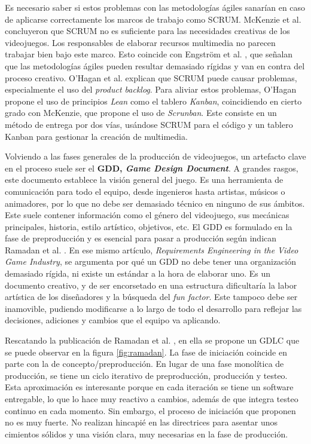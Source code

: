 Es necesario saber si estos problemas con las metodologías ágiles sanarían en caso de aplicarse correctamente los marcos de trabajo como SCRUM. McKenzie et al. \cite{mckenzie} concluyeron que SCRUM no es suficiente para las necesidades creativas de los videojuegos. Los responsables de elaborar recursos multimedia no parecen trabajar bien bajo este marco. Esto coincide con Engström et al. \cite{ENGSTROM201810}, que señalan que las metodologías ágiles pueden resultar demasiado rígidas y van en contra del proceso creativo. O'Hagan et al. \cite{ohagan} explican que SCRUM puede causar problemas, especialmente el uso del \textit{product backlog}. Para aliviar estos problemas, O'Hagan propone el uso de principios \textit{Lean} como el tablero \textit{Kanban}, coincidiendo en cierto grado con McKenzie, que propone el uso de \textit{Scrunban}. Este consiste en un método de entrega por dos vías, usándose SCRUM para el código y un tablero Kanban para gestionar la creación de multimedia.

Volviendo a las fases generales de la producción de videojuegos, un artefacto clave en el proceso suele ser el \textbf{GDD, \textit{Game Design Document}}. A grandes rasgos, este documento establece la visión general del juego. Es una herramienta de comunicación para todo el equipo, desde ingenieros hasta artistas, músicos o animadores, por lo que no debe ser demasiado técnico en ninguno de sus ámbitos. Este suele contener información como el género del videojuego, sus mecánicas principales, historia, estilo artístico, objetivos, etc. El GDD es formulado en la fase de preproducción y es esencial para pasar a producción según indican Ramadan et al. \cite{ramadan}. En ese mismo artículo, \textit{Requirements Engineering in the Video Game Industry}, se argumenta por qué un GDD no debe tener una organización demasiado rígida, ni existe un estándar a la hora de elaborar uno. Es un documento creativo, y de ser encorsetado en una estructura dificultaría la labor artística de los diseñadores y la búsqueda del \textit{fun factor}. Este tampoco debe ser inamovible, pudiendo modificarse a lo largo de todo el desarrollo para reflejar las decisiones, adiciones y cambios que el equipo va aplicando.

Rescatando la publicación de Ramadan et al. \cite{ramadan}, en ella se propone un GDLC que se puede observar en la figura \ref{fig:ramadan}. La fase de iniciación coincide en parte con la de concepto/preproducción. En lugar de una fase monolítica de producción, se tiene un ciclo iterativo de preproducción, producción y testeo. Esta aproximación es interesante porque en cada iteración se tiene un software entregable, lo que lo hace muy reactivo a cambios, además de que integra testeo continuo en cada momento. Sin embargo, el proceso de iniciación que proponen no es muy fuerte. No realizan hincapié en las directrices para asentar unos cimientos sólidos y una visión clara, muy necesarias en la fase de producción.

